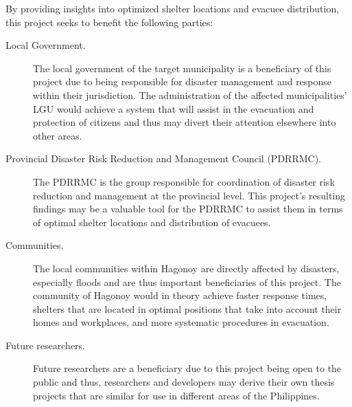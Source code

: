 By providing insights into optimized shelter locations and evacuee distribution, this project seeks to benefit the following parties:
\begin{description}
\item[Local Government.] The local government of the target municipality is a beneficiary of this project due to being responsible for disaster management and response within their jurisdiction. The administration of the affected municipalities’ LGU would achieve a system that will assist in the evacuation and protection of citizens and thus may divert their attention elsewhere into other areas.
\item[Provincial Disaster Risk Reduction and Management Council (PDRRMC).] The PDRRMC is the group responsible for coordination of disaster risk reduction and management at the provincial level. This project’s resulting findings may be a valuable tool for the PDRRMC to assist them in terms of optimal shelter locations and distribution of evacuees.
\item[Communities.] The local communities within Hagonoy are directly affected by disasters, especially floods and are thus important beneficiaries of this project. The community of Hagonoy would in theory achieve faster response times, shelters that are located in optimal positions that take into account their homes and workplaces, and more systematic procedures in evacuation.
\item[Future researchers.] Future researchers are a beneficiary due to this project being open to the public and thus, researchers and developers may derive their own thesis projects that are similar for use in different areas of the Philippines.
\end{description}
